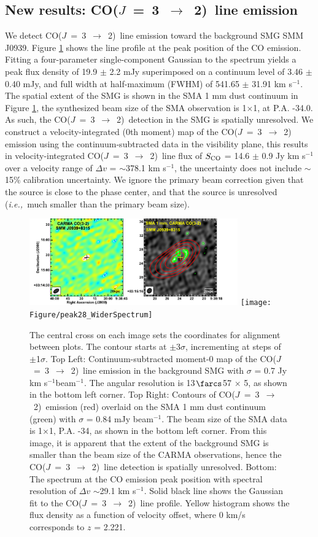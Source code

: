 \documentclass[twocolumn,apj,numberedappendix]{emulateapj}
\newcommand{\CO}{\mbox{CO($J$ = 3 $\rightarrow$ 2) }}
\newcommand{\ie}{{\sl i.e.,~}}
\newcommand{\pmOne}{$^{-1}$}
\begin{document}
\subsection{New results: \CO line emission}
We detect \CO line emission toward the background SMG SMM J0939. Figure \ref{fig:mom0} shows the line profile at the peak position of the CO emission. Fitting a four-parameter single-component Gaussian to the spectrum yields a peak flux density of 19.9 $\pm
$ 2.2 mJy superimposed on a continuum level of 3.46 $\pm$ 0.40 mJy, and full width at half-maximum (FWHM) of 541.65 $\pm$ 31.91 km s\pmOne. 
The spatial extent of the SMG is shown in the SMA 1 mm dust continuum in Figure \ref{fig:mom0}, the 
synthesized beam size of the SMA observation is 1$ \times $1, at P.A. -34.0\degr. As such, the \CO detection in the SMG is spatially unresolved. We construct a velocity-integrated (0th moment) map of the \CO 
emission using the continuum-subtracted data in the visibility plane, this results in velocity-integrated \CO line flux of $S_{\rm CO}$ = 14.6 $\pm$ 0.9 Jy km s\pmOne over a velocity range of $\Delta v$ = $\sim$378.1 km s\pmOne, the uncertainty does not include $\sim$ 15\% calibration uncertainty. We ignore the primary beam correction given that the source is close to the phase center, and that the source is unresolved (\ie much smaller than the primary beam size).

\begin{figure}[tbph] 
\centering
\includegraphics[width=0.8\textwidth]{Figure/LinePanel}
\texttt{[image: Figure/peak28\_WiderSpectrum]}
\caption{The central cross on each image sets the coordinates for alignment between plots. The contour starts at $\pm$3$\sigma$, 
incrementing at
steps of $\pm$1$\sigma$. Top Left: Continuum-subtracted moment-0 map of the \CO line emission in 
the background SMG with $\sigma$ = 0.7 Jy km s\pmOne beam\pmOne. The angular resolution is 13$\farcs$57 $\times$ 
5, as shown in the bottom left corner. 
Top Right: Contours of \CO emission (red) overlaid on the SMA 1 mm dust continuum (green) with $
\sigma$ = 0.84 mJy beam\pmOne. The beam size of the SMA data is 1$ \times $1, P.A. -34\degr, as shown 
in the bottom left corner. From this image, it is apparent that the extent of the background SMG is smaller than the beam 
size of the CARMA observations, hence the \CO line detection is spatially unresolved. Bottom: 
The spectrum at the CO emission peak position with spectral resolution of $\Delta v$ $\sim$29.1 km s\pmOne.
Solid black line shows the Gaussian fit to the \CO line profile. Yellow histogram shows the 
flux density as a function of velocity offset, where 0 km/s corresponds to $z$ = 2.221. \label{fig:mom0}}
\end{figure}
\end{document}
